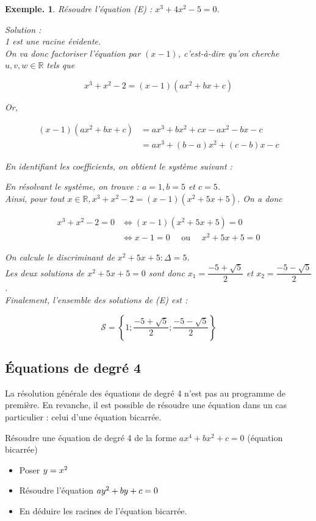 \documentclass[12pt]{article}
\theoremstyle{break}
\newtheorem*{example}{Exemple.}
\begin{document}
\begin{example}
Résoudre l'équation (E) : $x^{3}+4 x^{2}-5=0$.

Solution :\\
1 est une racine évidente.\\
On va donc factoriser l'équation par $(x-1)$, c'est-à-dire qu'on cherche $u, v, w \in \mathbb{R}$ tels que

$$
x^{3}+x^{2}-2=(x-1)\left(a x^{2}+b x+c\right)
$$

Or,

$$
\begin{aligned}
(x-1)\left(a x^{2}+b x+c\right) & =a x^{3}+b x^{2}+c x-a x^{2}-b x-c \\
& =a x^{3}+(b-a) x^{2}+(c-b) x-c
\end{aligned}
$$

En identifiant les coefficients, on obtient le système suivant :

En résolvant le système, on trouve : $a=1, b=5$ et $c=5$.\\
Ainsi, pour tout $x \in \mathbb{R}, x^{3}+x^{2}-2=(x-1)\left(x^{2}+5 x+5\right)$. On a donc

$$
\begin{aligned}
x^{3}+x^{2}-2=0 & \Longleftrightarrow(x-1)\left(x^{2}+5 x+5\right)=0 \\
& \Longleftrightarrow x-1=0 \quad \text { ou } \quad x^{2}+5 x+5=0
\end{aligned}
$$

On calcule le discriminant de $x^{2}+5 x+5: \Delta=5$.\\
Les deux solutions de $x^{2}+5 x+5=0$ sont donc $x_{1}=\dfrac{-5+\sqrt{5}}{2}$ et $x_{2}=\dfrac{-5-\sqrt{5}}{2}$.\\
Finalement, l'ensemble des solutions de (E) est :

$$
\mathcal{S}=\left\{1 ; \dfrac{-5+\sqrt{5}}{2} ; \dfrac{-5-\sqrt{5}}{2}\right\}
$$
\end{example}

\subsection{Équations de degré 4}
La résolution générale des équations de degré 4 n'est pas au programme de première. En revanche, il est possible de résoudre une équation dans un cas particulier : celui d'une équation bicarrée.

\begin{method}{Résoudre une équation de degré 4 de la forme $a x^{4}+b x^{2}+c=0$ (équation bicarrée)}{}
\begin{itemize}
  \item Poser $y=x^{2}$
  \item Résoudre l'équation $a y^{2}+b y+c=0$
  \item En déduire les racines de l'équation bicarrée.
\end{itemize}
\end{method}
\end{document}
